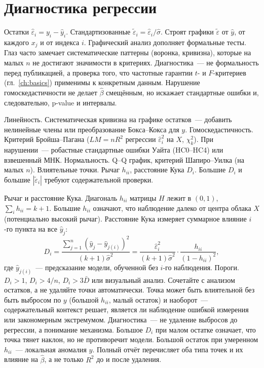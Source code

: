 \section{Диагностика регрессии}

Остатки $\hat\varepsilon_i=y_i-\hat y_i$. Стандартизованные $\tilde\varepsilon_i=\hat\varepsilon_i/\hat\sigma$.
Строят графики $\tilde\varepsilon$ от $\hat y$, от каждого $x_j$ и от индекса $i$.
Графический анализ дополняет формальные тесты. Глаз часто замечает систематические паттерны (воронка, кривизна), которые на малых $n$ не достигают значимости в критериях.
Диагностика~--- не формальность перед публикацией, а проверка того, что частотные гарантии $t$- и $F$-критериев (гл.~\ref{ch:basics}) применимы к конкретным данным.
Нарушение гомоскедастичности не делает $\hat\beta$ смещённым, но искажает стандартные ошибки и, следовательно, p-value и интервалы.

Линейность. Систематическая кривизна на графике остатков~--- добавить нелинейные члены или преобразование Бокса--Кокса для $y$.
Гомоскедастичность. Критерий Бройша--Пагана ($LM=nR^2$ регрессии $\hat\varepsilon_i^2$ на $X$, $\chi^2_k$). При нарушении~--- робастные стандартные ошибки Уайта (HC0--HC4) или взвешенный МНК.
Нормальность. Q--Q график, критерий Шапиро--Уилка (на малых $n$).
Влиятельные точки. Рычаг $h_{ii}$, расстояние Кука $D_i$. Большие $D_i$ и большие $|\tilde\varepsilon_i|$ требуют содержательной проверки.

Рычаг и расстояние Кука. Диагональ $h_{ii}$ матрицы $H$ лежит в $(0,1)$, $\sum_i h_{ii}=k+1$.
Большие $h_{ii}$ означают, что наблюдение далеко от центра облака $X$ (потенциально высокий рычаг).
Расстояние Кука измеряет суммарное влияние $i$-го пункта на все $\hat y_j$:
\[ D_i=\frac{\sum_{j=1}^n(\hat y_j-\hat y_{j(i)})^2}{(k+1)\hat\sigma^2} =\frac{\hat\varepsilon_i^2}{(k+1)\hat\sigma^2}\cdot\frac{h_{ii}}{(1-h_{ii})^2}, \]
где $\hat y_{j(i)}$~--- предсказание модели, обученной без $i$-го наблюдения.
Пороги. $D_i>1$, $D_i>4/n$, $D_i>3\bar D$ или визуальный анализ. Сочетайте с анализом остатков, а не удаляйте точки автоматически.
Точка может быть влиятельной без быть выбросом по $y$ (большой $h_{ii}$, малый остаток) и наоборот~--- содержательный контекст решает, является ли наблюдение ошибкой измерения или закономерным экстремумом.
Диагностика~--- не удаление выбросов до регрессии, а понимание механизма. Большое $D_i$ при малом остатке означает, что точка тянет наклон, но не противоречит модели. Большой остаток при умеренном $h_{ii}$~--- локальная аномалия $y$. Полный отчёт перечисляет оба типа точек и их влияние на $\hat\beta$, а не только $R^2$ до и после удаления.

